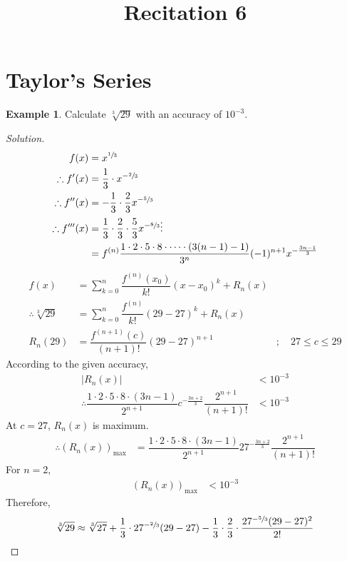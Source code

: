 \documentclass[fleqn, 12pt]{article}
\title{Recitation 6}
\author{}
\date{\formatdate{3}{12}{2014}}
\theoremstyle{definition}
\newtheorem{example}{Example}
\theoremstyle{theorem}
\newenvironment{solution}
{\begin{proof}[Solution]\let\qed\relax}
	{\end{proof}}
\begin{document}
\maketitle

\tableofcontents

\newpage
\section{Taylor's Series}

\begin{example}
	Calculate $\sqrt[3]{29}$ with an accuracy of $10^{-3}$.
\end{example}

\begin{solution}
	\begin{align*}
		f(x) &= x^{\sfrac{1}{3}}\\
		\therefore f'(x) &= \dfrac{1}{3} \cdot x^{-\sfrac{2}{3}}\\
		\therefore f''(x) &= -\dfrac{1}{3} \cdot \dfrac{2}{3} x^{-\sfrac{5}{3}}\\
		\therefore f'''(x) &= \dfrac{1}{3} \cdot \dfrac{2}{3} \cdot \dfrac{5}{3} x^{-\sfrac{8}{3}}
		\vdots\\
		&= f^{(n)} \dfrac{1 \cdot 2 \cdot 5 \cdot 8 \cdot \dots \cdot (3(n-1) - 1)}{3^n} (-1)^{n + 1} x^{-\frac{3n - 1}{3}}
	\end{align*}
	\begin{align*}
		f(x) &= \sum_{k = 0}^{n} \dfrac{f^{(n)}(x_0)}{{k!}} (x - x_0)^k + R_n (x)\\
		\therefore \sqrt[3]{29} &= \sum_{k = 0}^{n} \dfrac{f^{(n)}}{k!} (29 - 27)^k + R_n (x)\\
		R_n (29) &= \dfrac{f^{(n+1)}(c)}{(n+1)!} (29 - 27)^{n + 1} & ;\quad 27 \leq c \leq 29
	\end{align*}
	According to the given accuracy, 
	\begin{align*}
		|R_n (x)| &< 10^{-3}\\
		\therefore \dfrac{1 \cdot 2 \cdot 5 \cdot 8 \cdot (3n - 1)}{2^{n + 1}} c^{-\frac{3n + 2}{3}} \dfrac{2^{n + 1}}{(n + 1)!} &< 10^{-3}
	\end{align*}
	At $c = 27$, $R_n (x)$ is maximum.
	\begin{align*}
		\therefore (R_n (x))_{\text{max}} &= \dfrac{1 \cdot 2 \cdot 5 \cdot 8 \cdot (3n - 1)}{2^{n + 1}} 27^{-\frac{3n + 2}{3}} \dfrac{2^{n + 1}}{(n + 1)!} 
	\end{align*}
	For $n = 2$,
	\begin{align*}
		(R_n (x))_{\text{max}} &< 10^{-3}
	\end{align*}
	Therefore,
	\begin{align*}
		\sqrt[3]{29} \approx \sqrt[3]{27} + \dfrac{1}{3} \cdot 27^{-\sfrac{2}{3}} (29 - 27) - \dfrac{1}{3} \cdot \dfrac{2}{3} \cdot \dfrac{27^{-\sfrac{5}{3} }(29 - 27)^2}{2!}
	\end{align*}
\end{solution}
\end{document}
